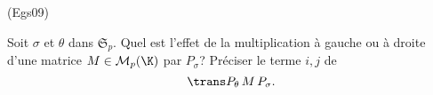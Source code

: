 \begin{tiny}(Egs09)\end{tiny} Soit $\sigma$ et $\theta$ dans $\mathfrak{S}_p$. Quel est l'effet de la multiplication à gauche ou à droite d'une matrice $M\in \mathcal{M}_p(\K)$ par $P_\sigma$? Préciser le terme $i,j$ de 
\[
 \trans P_{\theta}\, M\, P_\sigma.
\]
